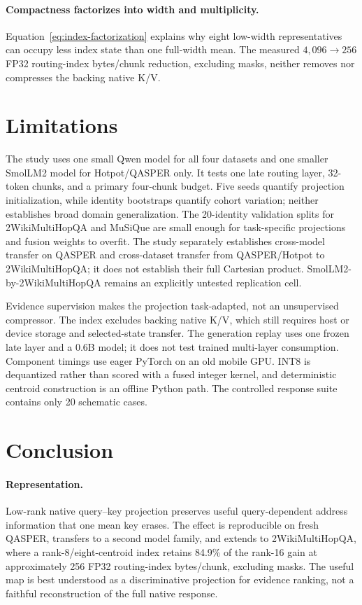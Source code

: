 \documentclass[11pt]{article}
\newcommand{\kv}{\textsc{K/V}\xspace}
\newcommand{\qasper}{QASPER\xspace}
\newcommand{\twowiki}{2WikiMultiHopQA\xspace}
\newcommand{\musique}{MuSiQue\xspace}
\begin{document}
\paragraph{Compactness factorizes into width and multiplicity.}
Equation~\ref{eq:index-factorization} explains why eight low-width
representatives can occupy less index state than one full-width mean. The
measured $4{,}096\rightarrow256$ FP32 routing-index bytes/chunk reduction,
excluding masks, neither removes nor compresses the backing native \kv.

\section{Limitations}
The study uses one small Qwen model for all four datasets and one smaller
SmolLM2 model for Hotpot/QASPER only. It tests one late routing layer, 32-token
chunks, and a primary four-chunk budget. Five seeds quantify projection
initialization, while identity bootstraps quantify cohort variation; neither
establishes broad domain generalization. The 20-identity validation splits for
\twowiki and \musique are small enough for task-specific projections and
fusion weights to overfit. The study separately establishes cross-model
transfer on \qasper and cross-dataset transfer from QASPER/Hotpot to \twowiki;
it does not establish their full Cartesian product. SmolLM2-by-\twowiki remains
an explicitly untested replication cell.

Evidence supervision makes the projection task-adapted, not an unsupervised
compressor. The index excludes backing native \kv, which still requires host or
device storage and selected-state transfer. The generation replay uses one
frozen late layer and a 0.6B model; it does not test trained multi-layer
consumption. Component timings use eager PyTorch on an old mobile GPU. INT8 is
dequantized rather than scored with a fused integer kernel, and deterministic
centroid construction is an offline Python path. The controlled response suite
contains only 20 schematic cases.

\section{Conclusion}
\paragraph{Representation.}
Low-rank native query--key projection preserves useful query-dependent address
information that one mean key erases. The effect is reproducible on fresh
\qasper, transfers to a second model family, and extends to \twowiki, where a
rank-8/eight-centroid index retains 84.9\% of the rank-16 gain at approximately
256 FP32 routing-index bytes/chunk, excluding masks. The useful map is best
understood as a discriminative projection for evidence ranking, not a faithful
reconstruction of the full native response.
\end{document}
